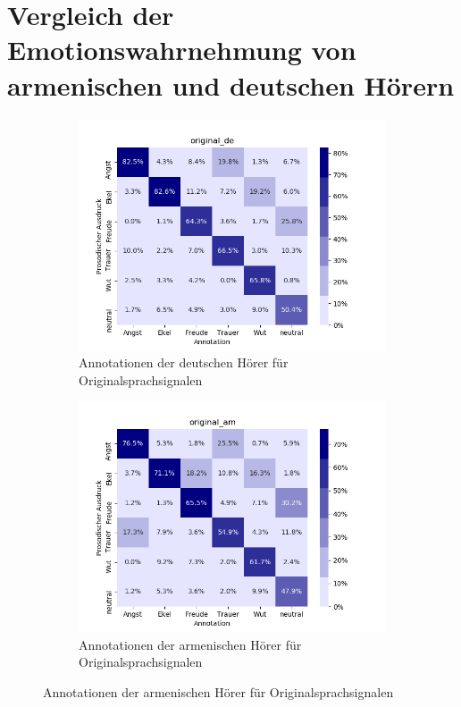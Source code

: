 \documentclass[11pt,a4paper,headsepline,twoside,toc=bibliography]{scrreprt}
\begin{document}

\section{Vergleich der Emotionswahrnehmung von armenischen und deutschen Hörern}

\begin{figure}[t!] %
	\begin{subfigure}{0.48\textwidth}
		\includegraphics[width=\linewidth]{plots/heatmap/conf_original_de.png}
		\caption{Annotationen der deutschen Hörer für Originalsprachsignalen} \label{fig:conf_original_de}
	\end{subfigure}\hspace*{\fill}
	\begin{subfigure}{0.48\textwidth}
		\includegraphics[width=\linewidth]{plots/heatmap/conf_original_am.png}
		\caption{Annotationen der armenischen Hörer für Originalsprachsignalen} \label{fig:conf_original_de}
	\end{subfigure}
	

\end{figure}
\end{document}
